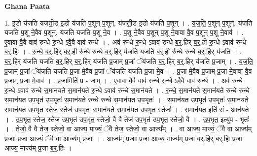 \documentclass[17pt]{extarticle}
\begin{document}
\textbf{Ghana Paata } \newline

1. इ॒डो य॑जति यजती॒ड इ॒डो य॑जति प॒शून् प॒शून्. य॑जती॒ड इ॒डो य॑जति प॒शून् । . य॒ज॒ति॒ प॒शून् प॒शून्. य॑जति यजति प॒शू ने॒वैव प॒शून्. य॑जति यजति प॒शू ने॒व । . प॒शू ने॒वैव प॒शून् प॒शू ने॒वावा वै॒व प॒शून् प॒शू ने॒वाव॑ । . ए॒वावा वै॒वै वाव॑ रुन्धे रु॒न्धे ऽवै॒वै वाव॑ रुन्धे । . अव॑ रुन्धे रु॒न्धे ऽवाव॑ रुन्धे ब॒र्॒.हिर् ब॒र्॒.ही रु॒न्धे ऽवाव॑ रुन्धे ब॒र्॒.हिः । . रु॒न्धे॒ ब॒र्॒.हिर् ब॒र्॒.ही रु॑न्धे रुन्धे ब॒र्॒.हिर् य॑जति यजति ब॒र्॒.ही रु॑न्धे रुन्धे ब॒र्॒.हिर् य॑जति । . ब॒र्॒.हिर् य॑जति यजति ब॒र्॒.हिर् ब॒र्॒.हिर् य॑जति प्र॒जाम् प्र॒जां ॅय॑जति ब॒र्॒.हिर् ब॒र्॒.हिर् य॑जति प्र॒जाम् । . य॒ज॒ति॒ प्र॒जाम् प्र॒जां ॅय॑जति यजति प्र॒जा मे॒वैव प्र॒जां ॅय॑जति यजति प्र॒जा मे॒व । . प्र॒जा मे॒वैव प्र॒जाम् प्र॒जा मे॒वावा वै॒व प्र॒जाम् प्र॒जा मे॒वाव॑ । . प्र॒जामिति॑ प्र - जाम् । . ए॒वावा वै॒वै वाव॑ रुन्धे रु॒न्धे ऽवै॒वै वाव॑ रुन्धे । . अव॑ रुन्धे रु॒न्धे ऽवाव॑ रुन्धे स॒मान॑यते स॒मान॑यते रु॒न्धे ऽवाव॑ रुन्धे स॒मान॑यते । . रु॒न्धे॒ स॒मान॑यते स॒मान॑यते रुन्धे रुन्धे स॒मान॑यत उप॒भृत॑ उप॒भृतः॑ स॒मान॑यते रुन्धे रुन्धे स॒मान॑यत उप॒भृतः॑ । . स॒मान॑यत उप॒भृत॑ उप॒भृतः॑ स॒मान॑यते स॒मान॑यत उप॒भृत॒ स्तेज॒ स्तेज॑ उप॒भृतः॑ स॒मान॑यते स॒मान॑यत उप॒भृत॒ स्तेजः॑ । . स॒मान॑यत॒ इति॑ सं - आन॑यते । . उ॒प॒भृत॒ स्तेज॒ स्तेज॑ उप॒भृत॑ उप॒भृत॒ स्तेजो॒ वै वै तेज॑ उप॒भृत॑ उप॒भृत॒ स्तेजो॒ वै । . उ॒प॒भृत॒ इत्यु॑प - भृतः॑ । . तेजो॒ वै वै तेज॒ स्तेजो॒ वा आज्य॒ माज्यं॒ ॅवै तेज॒ स्तेजो॒ वा आज्य᳚म् । . वा आज्य॒ माज्यं॒ ॅवै वा आज्य॑म् प्र॒जाः प्र॒जा आज्यं॒ ॅवै वा आज्य॑म् प्र॒जाः । . आज्य॑म् प्र॒जाः प्र॒जा आज्य॒ माज्य॑म् प्र॒जा ब॒र्॒.हिर् ब॒र्॒.हिः प्र॒जा आज्य॒ माज्य॑म् प्र॒जा ब॒र्॒.हिः । \newline
\end{document}
